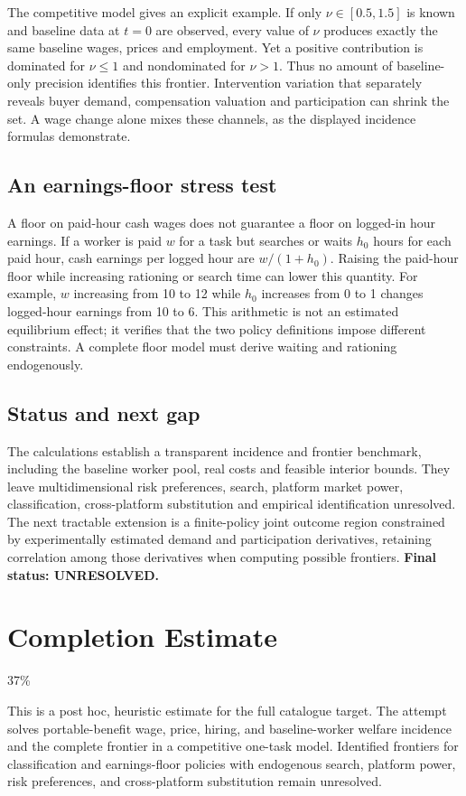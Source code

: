 \documentclass[11pt]{article}
\begin{document}
The competitive model gives an explicit example. If only $\nu\in[0.5,1.5]$
is known and baseline data at $t=0$ are observed, every value of $\nu$
produces exactly the same baseline wages, prices and employment. Yet a
positive contribution is dominated for $\nu\leq1$ and nondominated for
$\nu>1$. Thus no amount of baseline-only precision identifies this frontier.
Intervention variation that separately reveals buyer demand, compensation
valuation and participation can shrink the set. A wage change alone mixes
these channels, as the displayed incidence formulas demonstrate.

\subsection*{An earnings-floor stress test}
A floor on paid-hour cash wages does not guarantee a floor on logged-in
hour earnings. If a worker is paid $w$ for a task but searches or waits
$h_0$ hours for each paid hour, cash earnings per logged hour are
$w/(1+h_0)$. Raising the paid-hour floor while increasing rationing or
search time can lower this quantity. For example, $w$ increasing from
10 to 12 while $h_0$ increases from 0 to 1 changes logged-hour earnings
from 10 to 6. This arithmetic is not an estimated equilibrium effect;
it verifies that the two policy definitions impose different constraints.
A complete floor model must derive waiting and rationing endogenously.

\subsection*{Status and next gap}
The calculations establish a transparent incidence and frontier benchmark,
including the baseline worker pool, real costs and feasible interior
bounds. They leave multidimensional risk preferences, search, platform
market power, classification, cross-platform substitution and empirical
identification unresolved. The next tractable extension is a finite-policy
joint outcome region constrained by experimentally estimated demand and
participation derivatives, retaining correlation among those derivatives
when computing possible frontiers. \textbf{Final status: UNRESOLVED.}

\section{Completion Estimate}
37\%

This is a post hoc, heuristic estimate for the full catalogue target.
The attempt solves portable-benefit wage, price, hiring, and baseline-worker welfare incidence and the complete frontier in a competitive one-task model. Identified frontiers for classification and earnings-floor policies with endogenous search, platform power, risk preferences, and cross-platform substitution remain unresolved.
\end{document}
